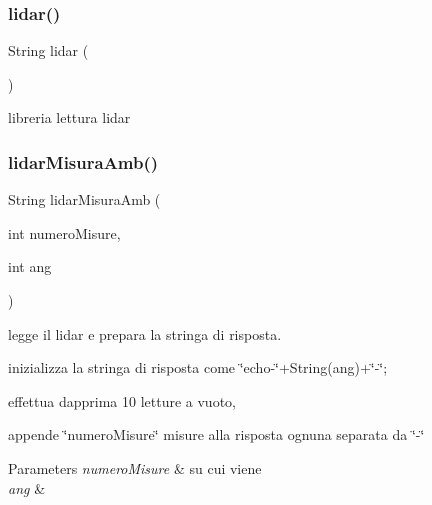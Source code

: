 \subsubsection{\texorpdfstring{lidar()}{lidar()}}
{\footnotesize\ttfamily String lidar (\begin{DoxyParamCaption}{ }\end{DoxyParamCaption})}



libreria lettura lidar 

\mbox{\label{ari_pi__2_d_c__esp__08_8ino_a0f6c65484953fd460fd89ee3a1a3825e}} 
\subsubsection{\texorpdfstring{lidar\+Misura\+Amb()}{lidarMisuraAmb()}}
{\footnotesize\ttfamily String lidar\+Misura\+Amb (\begin{DoxyParamCaption}\item[{int}]{numero\+Misure,  }\item[{int}]{ang }\end{DoxyParamCaption})}



legge il lidar e prepara la stringa di risposta. 

inizializza la stringa di risposta come \char`\"{}echo-\/\char`\"{}+\+String(ang)+\char`\"{}-\/\char`\"{};

effettua dapprima 10 letture a vuoto,

appende \char`\"{}numero\+Misure\char`\"{} misure alla risposta ognuna separata da \char`\"{}-\/\char`\"{}


\begin{DoxyParams}{Parameters}
{\em numero\+Misure} & su cui viene \\
\hline
{\em ang} & \\
\hline
\end{DoxyParams}
\mbox{\label{ari_pi__2_d_c__esp__08_8ino_afe461d27b9c48d5921c00d521181f12f}} 
